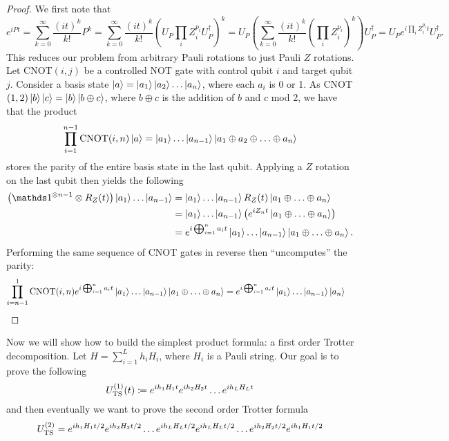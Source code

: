 \begin{proof}
    We first note that 
    \begin{equation}
        e^{i P t} = \sum_{k = 0}^\infty \frac{(i t)^k}{k!} P^k = \sum_{k = 0}^\infty \frac{(i t)^k}{k!} (U_P \prod_i Z_i^{p_i} U_P^\dagger)^k = U_P \left(\sum_{k = 0}^\infty \frac{(i t)^k}{k!} ( \prod_i Z_i^{p_i})^k \right) U_P^\dagger = U_P e^{i \prod_i Z_i^{p_i} t} U_P^\dagger.
    \end{equation}
    This reduces our problem from arbitrary Pauli rotations to just Pauli $Z$ rotations.
    Let CNOT$(i,j)$ be a controlled NOT gate with control qubit $i$ and target qubit $j$. Consider a basis state $\ket{a} = \ket{a_1}\ket{a_2}\ldots \ket{a_n}$, where each $a_i$ is 0 or 1. As CNOT$(1,2) \ket{b}\ket{c} = \ket{b} \ket{b \oplus c}$, where $b \oplus c$ is the addition of $b$ and $c$ mod 2, we have that the product
    \begin{equation}
        \prod_{i = 1}^{n - 1} {\rm CNOT}(i, n) \ket{a} = \ket{a_1} \ldots \ket{a_{n-1}} \ket{a_1 \oplus a_2 \oplus \ldots \oplus a_n}
    \end{equation}
    stores the parity of the entire basis state in the last qubit. Applying a $Z$ rotation on the last qubit then yields the following
    \begin{align}
        \left(\identity^{\otimes n - 1} \otimes R_Z(t)\right) \ket{a_1} \ldots \ket{a_{n-1}} &= \ket{a_1} \ldots \ket{a_{n- 1}} R_Z(t) \ket{a_1 \oplus \ldots \oplus a_n} \\
        &= \ket{a_1} \ldots \ket{a_{n- 1}} \left(e^{i Z_n t} \ket{a_1 \oplus \ldots \oplus a_n} \right) \\
        &= e^{i \bigoplus_{i = 1}^n a_i t} \ket{a_1} \ldots \ket{a_{n- 1}} \ket{a_1 \oplus \ldots \oplus a_n}.
    \end{align}
    Performing the same sequence of CNOT gates in reverse then ``uncomputes'' the parity:
    \begin{align}
        \prod_{i = n- 1}^{1} {\rm CNOT}(i, n) e^{i \bigoplus_{i = 1}^n a_i t} \ket{a_1} \ldots \ket{a_{n- 1}} \ket{a_1 \oplus \ldots \oplus a_n} &= e^{i \bigoplus_{i = 1}^n a_i t} \ket{a_1} \ldots \ket{a_{n- 1}} \ket{a_n}
    \end{align}
\end{proof}

Now we will show how to build the simplest product formula: a first order Trotter decomposition. 
Let $H = \sum_{i = 1}^{L} h_i H_i$, where $H_i$ is a Pauli string. Our goal is to prove the following
\begin{equation}
    U_{\rm TS}^{(1)}(t) \coloneqq e^{i h_1 H_1 t}e^{i h_2 H_2 t} \ldots e^{i h_L H_L t} 
\end{equation}
and then eventually we want to prove the second order Trotter formula
\begin{equation}
    U_{\rm TS}^{(2)} = e^{i h_1 H_1 t/2} e^{i h_2 H_2 t/2} \ldots e^{i h_L H_L t / 2} e^{i h_L H_L t / 2} \ldots e^{i h_2 H_2 t/2} e^{i h_1 H_1 t/2}
\end{equation}


